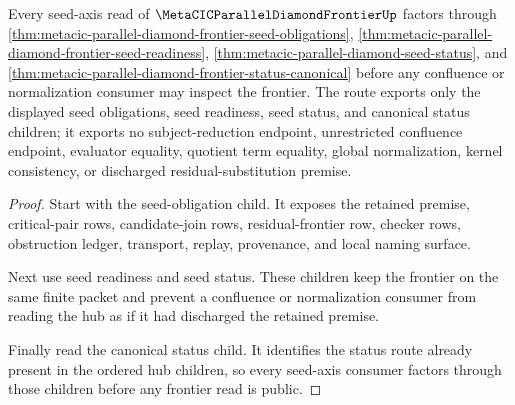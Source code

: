 \begin{theorem}
\label{thm:metacic-parallel-diamond-frontier-seed-axis-summary-route}
Every seed-axis read of $\MetaCICParallelDiamondFrontierUp$ factors through \autoref{thm:metacic-parallel-diamond-frontier-seed-obligations}, \autoref{thm:metacic-parallel-diamond-frontier-seed-readiness}, \autoref{thm:metacic-parallel-diamond-seed-status}, and \autoref{thm:metacic-parallel-diamond-frontier-status-canonical} before any confluence or normalization consumer may inspect the frontier. The route exports only the displayed seed obligations, seed readiness, seed status, and canonical status children; it exports no subject-reduction endpoint, unrestricted confluence endpoint, evaluator equality, quotient term equality, global normalization, kernel consistency, or discharged residual-substitution premise.
\end{theorem}
\begin{proof}
Start with the seed-obligation child. It exposes the retained premise, critical-pair rows, candidate-join rows, residual-frontier row, checker rows, obstruction ledger, transport, replay, provenance, and local naming surface.

Next use seed readiness and seed status. These children keep the frontier on the same finite packet and prevent a confluence or normalization consumer from reading the hub as if it had discharged the retained premise.

Finally read the canonical status child. It identifies the status route already present in the ordered hub children, so every seed-axis consumer factors through those children before any frontier read is public.
\end{proof}
